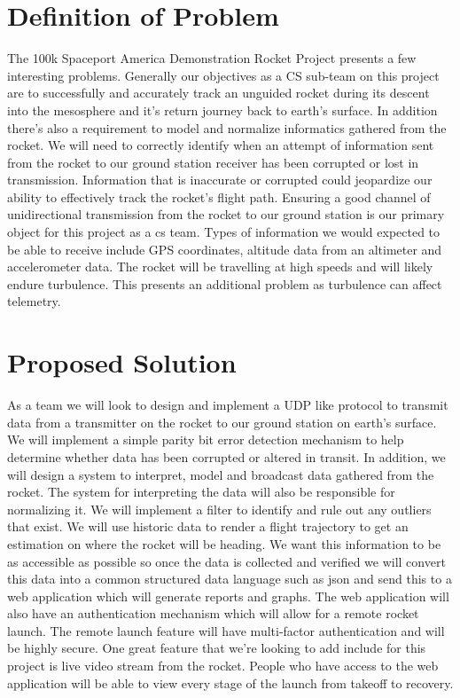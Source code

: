 \documentclass[onecolumn, draftclsnofoot,10pt, compsoc]{IEEEtran}
\begin{document}
\newpage
{}
\tableofcontents
\clearpage

\section{Definition of Problem}
The 100k Spaceport America Demonstration Rocket Project presents a few interesting problems. Generally our objectives as a CS sub-team on this project are to successfully and accurately track an unguided rocket during its descent into the mesosphere and it’s return journey back to earth's surface. In addition there’s also a requirement to model and normalize informatics gathered from the rocket. We will need to correctly identify when an attempt of information sent from the rocket to our ground station receiver has been corrupted or lost in transmission. Information that is inaccurate or corrupted could jeopardize our ability to effectively track the rocket's flight path. Ensuring a good channel of unidirectional transmission from the rocket to our ground station is our primary object for this project as a cs team. Types of information we would expected to be able to receive include GPS coordinates, altitude data from an altimeter and accelerometer data. The rocket will be travelling at high speeds and will likely endure turbulence. This presents an additional problem as turbulence can affect telemetry. 
\section{Proposed Solution}
As a team we will look to design and implement a UDP like protocol to transmit data from a transmitter on the rocket to our ground station on earth’s surface. We will implement a simple parity bit error detection mechanism to help determine whether data has been corrupted or altered in transit. In addition, we will design a system to interpret, model and broadcast data gathered from the rocket. The system for interpreting the data will also be responsible for normalizing it. We will implement a filter to identify and rule out any outliers that exist. We will use historic data to render a flight trajectory to get an estimation on where the rocket will be heading. We want this information to be as accessible as possible so once the data is collected and verified we will convert this data into a common structured data language such as json and send this to a web application which will generate reports and graphs. The web application will also have an authentication mechanism which will allow for a remote rocket launch. The remote launch feature will have multi-factor authentication and will be highly secure. One great feature that we’re looking to add include for this project is live video stream from the rocket. People who have access to the web application will be able to view every stage of the launch from takeoff to recovery. 
\end{document}
